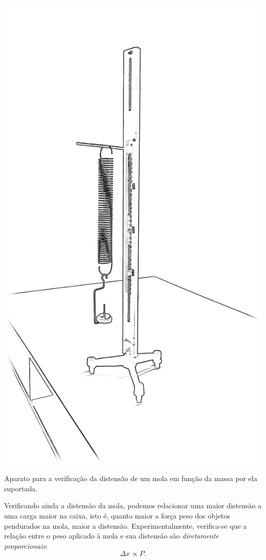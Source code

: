 \begin{marginfigure}
\includegraphics[width=\textwidth]{Ilustrations/Hooke.png}
\caption{Aparato para a verificação da distensão de um mola em função da massa por ela suportada.}
\end{marginfigure}

Verificando ainda a distensão da mola, podemos relacionar uma maior distensão a uma carga maior na caixa, isto é, quanto maior a força peso dos objetos pendurados na mola, maior a distensão. Experimentalmente, verifica-se que a relação entre o peso aplicado à mola e sua distensão são \emph{diretamente proporcionais}:
\begin{equation}
	\Delta x \propto P.
\end{equation}

